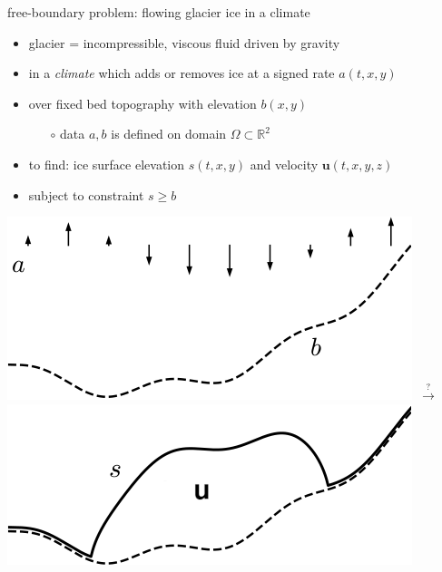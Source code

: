 \documentclass[svgnames,
               hyperref={colorlinks,citecolor=DeepPink4,linkcolor=FireBrick,urlcolor=Maroon},
               usepdftitle=false]  %
               {beamer}
\newcommand{\RR}{\mathbb{R}}
\newcommand{\bu}{\mathbf{u}}
\begin{document}
\begin{frame}{free-boundary problem: flowing glacier ice in a climate}

\begin{itemize}
\item glacier = incompressible, viscous fluid driven by gravity
\item in a \emph{climate} which adds or removes ice at a signed rate $a(t,x,y)$
\item over fixed bed topography with elevation $b(x,y)$
    \begin{itemize}
    \item[$\circ$] data $a,b$ is defined on domain $\Omega \subset \RR^2$
    \end{itemize}
\item to find: ice surface elevation $s(t,x,y)$ and velocity $\bu(t,x,y,z)$
\item subject to constraint $\boxed{s\ge b}$
\end{itemize}

\bigskip
\hfill \mbox{\includegraphics[height=0.24\textheight]{../talk-oxford/images/domain-data.png} \quad $\stackrel{?}{\to}$ \quad \includegraphics[height=0.24\textheight]{../talk-oxford/images/domain-velocity.png}}
\end{frame}
\end{document}
